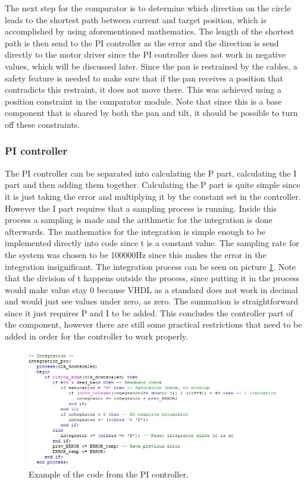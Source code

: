 The next step for the comparator is to determine which direction on the circle leads to the shortest path between current and target position, which is accomplished by using aforementioned mathematics. The length of the shortest path is then send to the PI controller as the error and the direction is send directly to the motor driver since the PI controller does not work in negative values, which will be discussed later.
Since the pan is restrained by the cables, a safety feature is needed to make sure that if the pan receives a position that contradicts this restraint, it does not move there. This was achieved using a position constraint in the comparator module. Note that since this is a base component that is shared by both the pan and tilt, it should be possible to turn off these constraints.



\subsubsection{PI controller}

The PI controller can be separated into calculating the P part, calculating the I part and then adding them together. Calculating the P part is quite simple since it is just taking the error and multiplying it by the constant set in the controller. However the I part requires that a sampling process is running. Inside this process a sampling is made and the arithmetic for the integration is done afterwards. The mathematics for the integration is simple enough to be implemented directly into code since t is a constant value. The sampling rate for the system was chosen to be 100000Hz since this makes the error in the integration insignificant. The integration process can be seen on picture \ref{fig:PI controller code example}. Note that the division of t happens outside the process, since putting it in the process would make value stay 0 because VHDL as a standard does not work in decimal and would just see values under zero, as zero. The summation is straightforward since it just requires P and I to be added. This concludes the controller part of the component, however there are still some practical restrictions that need to be added in order for the controller to work properly.


\begin{figure}[h!]
\centering
\includegraphics[scale=0.7]{Billeder/FPGA/PI_controller_code_example.jpg}
\caption{Example of the code from the PI controller.}
\label{fig:PI controller code example}
\end{figure}


